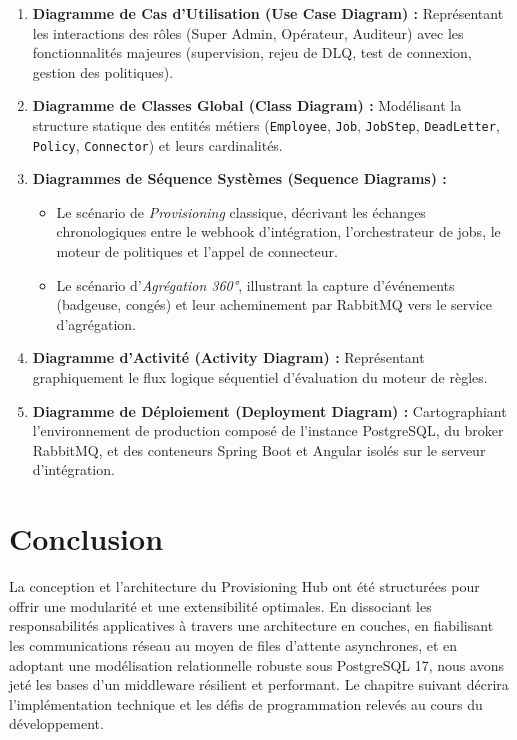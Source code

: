 \begin{enumerate}
    \item \textbf{Diagramme de Cas d'Utilisation (Use Case Diagram) :} Représentant les interactions des rôles (Super Admin, Opérateur, Auditeur) avec les fonctionnalités majeures (supervision, rejeu de DLQ, test de connexion, gestion des politiques).
    \item \textbf{Diagramme de Classes Global (Class Diagram) :} Modélisant la structure statique des entités métiers (\texttt{Employee}, \texttt{Job}, \texttt{JobStep}, \texttt{DeadLetter}, \texttt{Policy}, \texttt{Connector}) et leurs cardinalités.
    \item \textbf{Diagrammes de Séquence Systèmes (Sequence Diagrams) :}
        \begin{itemize}
            \item Le scénario de \textit{Provisioning} classique, décrivant les échanges chronologiques entre le webhook d'intégration, l'orchestrateur de jobs, le moteur de politiques et l'appel de connecteur.
            \item Le scénario d'\textit{Agrégation 360°}, illustrant la capture d'événements (badgeuse, congés) et leur acheminement par RabbitMQ vers le service d'agrégation.
        \end{itemize}
    \item \textbf{Diagramme d'Activité (Activity Diagram) :} Représentant graphiquement le flux logique séquentiel d'évaluation du moteur de règles.
    \item \textbf{Diagramme de Déploiement (Deployment Diagram) :} Cartographiant l'environnement de production composé de l'instance PostgreSQL, du broker RabbitMQ, et des conteneurs Spring Boot et Angular isolés sur le serveur d'intégration.
\end{enumerate}

\section{Conclusion}
La conception et l'architecture du Provisioning Hub ont été structurées pour offrir une modularité et une extensibilité optimales. En dissociant les responsabilités applicatives à travers une architecture en couches, en fiabilisant les communications réseau au moyen de files d'attente asynchrones, et en adoptant une modélisation relationnelle robuste sous PostgreSQL 17, nous avons jeté les bases d'un middleware résilient et performant. Le chapitre suivant décrira l'implémentation technique et les défis de programmation relevés au cours du développement.
